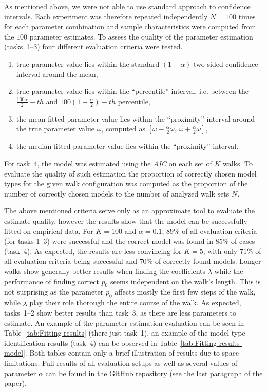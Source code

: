 \documentclass{amsart}
\theoremstyle{definition}
\theoremstyle{plain}
\theoremstyle{plain}
\theoremstyle{plain}
\numberwithin{equation}{section}
\begin{document}
    As mentioned above, we were not able to use standard approach to confidence intervals.
    Each experiment was therefore repeated independently $N=100$ times for each parameter combination and sample characteristics were computed from the $100$ parameter estimates.
    To assess the quality of the parameter estimation (tasks~1--3) four different evaluation criteria were tested.
    \begin{enumerate}
        \color{red}
        \item true parameter value lies within the standard $(1-\alpha)$ two-sided confidence interval around the mean,
        \item true parameter value lies within the ``percentile'' interval, i.e. between the $\frac{{100}\alpha}{2}-th$ and $100\left(1-\frac{\alpha}{2}\right)-th$ percentile,
        \item the mean fitted parameter value lies within the ``proximity'' interval around the true parameter value $\omega$, computed as $[\omega-\frac{\alpha}{2}\omega,\,\omega+\frac{\alpha}{2}\omega]$,
        \item the median fitted parameter value lies within the ``proximity'' interval.
    \end{enumerate}
    For task~4, the model was estimated using the \emph{AIC} on each set of $K$ walks.
    To evaluate the quality of such estimation the proportion of correctly chosen model types for the given walk configuration was computed {\color{red}as the proportion of the number of correctly chosen models to the number of analyzed walk sets $N$}.

    The above mentioned criteria serve only as an approximate tool to evaluate the estimate quality, however the results show that the model can be successfully fitted on empirical data.
    For $K=100$ and $\alpha=0.1$, $89\%$ of all evaluation criteria (for tasks 1--3) were successful and the correct model was found in $85\%$ of cases (task~4).
    As expected, the results are less convincing for $K=5$, with only $71\%$ of all evaluation criteria being successful and $70\%$ of correctly found models.
    Longer walks show generally better results when finding the coefficients $\tilde{\lambda}$ while the performance of finding correct $p_0$ seems independent on the walk's length.
    This is not surprising as the parameter $p_0$ affects mostly the first few steps of the walk, while $\tilde{\lambda}$ play their role thorough the entire course of the walk.
    As expected, tasks~1--2 show better results than task~3, as there are less parameters to estimate.
    An example of the parameter estimation evaluation can be seen in Table~\ref{tab:Fitting-results} {\color{red}(there just task~1)}, an example of the model type identification results (task~4) can be observed in Table~\ref{tab:Fitting-results-model}.
    Both tables contain only a brief illustration of results due to space limitations.
    Full results of all evaluation setups as well as several values of parameter $\alpha$ can be found in the GitHub repository (see the last paragraph of the paper).
\end{document}
